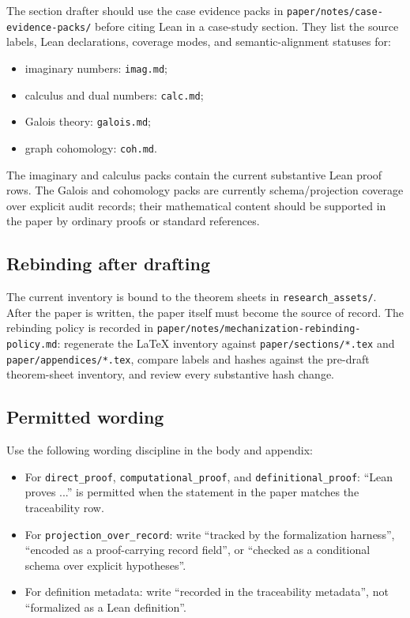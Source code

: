 \documentclass[11pt]{article}
\theoremstyle{definition}
\begin{document}
The section drafter should use the case evidence packs in
\texttt{paper/notes/case-evidence-packs/} before citing Lean in a case-study
section.  They list the source labels, Lean declarations, coverage modes, and
semantic-alignment statuses for:

\begin{itemize}
\item imaginary numbers: \texttt{imag.md};
\item calculus and dual numbers: \texttt{calc.md};
\item Galois theory: \texttt{galois.md};
\item graph cohomology: \texttt{coh.md}.
\end{itemize}

The imaginary and calculus packs contain the current substantive Lean proof
rows.  The Galois and cohomology packs are currently schema/projection
coverage over explicit audit records; their mathematical content should be
supported in the paper by ordinary proofs or standard references.

\subsection{Rebinding after drafting}

The current inventory is bound to the theorem sheets in
\texttt{research\_assets/}.  After the paper is written, the paper itself must
become the source of record.  The rebinding policy is recorded in
\texttt{paper/notes/mechanization-rebinding-policy.md}: regenerate the LaTeX
inventory against \texttt{paper/sections/*.tex} and
\texttt{paper/appendices/*.tex}, compare labels and hashes against the
pre-draft theorem-sheet inventory, and review every substantive hash change.

\subsection{Permitted wording}

Use the following wording discipline in the body and appendix:

\begin{itemize}
\item For \texttt{direct\_proof}, \texttt{computational\_proof}, and
  \texttt{definitional\_proof}: ``Lean proves ...'' is permitted when the
  statement in the paper matches the traceability row.
\item For \texttt{projection\_over\_record}: write ``tracked by the
  formalization harness'', ``encoded as a proof-carrying record field'', or
  ``checked as a conditional schema over explicit hypotheses''.
\item For definition metadata: write ``recorded in the traceability metadata'',
  not ``formalized as a Lean definition''.
\end{itemize}
\end{document}
